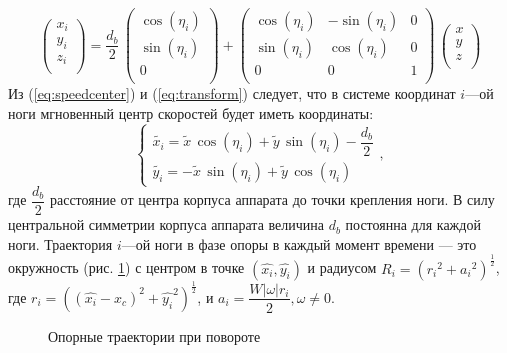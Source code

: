  \begin{equation}
 \left(
\begin{array}{c}
x_i\\
y_i\\
z_i\\
\end{array}\right) = \dfrac{d_b}{2}\,
 \left(\begin{array}{c}
\cos(\eta_i)\\ \sin(\eta_i)\\ 0\\
\end{array}\right)
+
\left(
\begin{array}{lcr}
\cos(\eta_i)&-\sin(\eta_i)&0\\ \sin(\eta_i)&\cos(\eta_i)&0\\ 0&0&1\\
\end{array}
\right)\,\left(
\begin{array}{c}
x\\ y\\ z\\
\end{array}
\right)
\label{eq:transform}
\end{equation}
Из (\ref{eq:speedcenter}) и (\ref{eq:transform}) следует, что в системе координат $i$---ой ноги мгновенный центр скоростей будет иметь координаты:
\begin{equation}
\left\{
\begin{array}{lcr}
\tilde{x_i} = \tilde{x}\,\cos(\eta_i)+\tilde{y}\,\sin(\eta_i)-\dfrac{d_b}{2}\\
\tilde{y_i} = -\tilde{x}\,\sin(\eta_i)+\tilde{y}\,\cos(\eta_i)
\end{array}
\right.,
\end{equation}
где $\dfrac{d_b}{2}$ расстояние от центра корпуса аппарата до точки крепления ноги. В силу центральной симметрии корпуса аппарата величина $d_b$ постоянна для каждой ноги.
Траектория $i$---ой ноги в фазе опоры в каждый момент времени --- это окружность (рис. \ref{fig:circ1}) с центром в точке $(\hat{x_i},\hat{y_i})$ и радиусом $R_i=({r_i}^2+{a_i}^2)^\frac{1}{2}$, где $r_i=((\hat{x_i}-x_c)^2+{\hat{y_i}}^2)^\frac{1}{2}$, и $a_i=\dfrac{W|\omega|r_i}{2}, \omega\neq0$.

 \begin{figure}[h]
 \caption{Опорные траектории при повороте}
 \label{fig:circ1}
 \end{figure}
 
